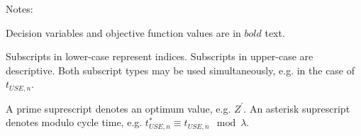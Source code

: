 Notes:

Decision variables and objective function values are in 
$\boldsymbol{\mathit{bold}}$ text.

Subscripts in lower-case represent indices.
Subscripts in upper-case are descriptive.
Both subscript types may be used simultaneously, e.g. in the case of
$t_{USE,n}$.

A prime suprescript denotes an optimum value, e.g. $Z^{\prime}$.
An asterisk suprescript denotes modulo cycle time, e.g.
$t_{\mathit{USE},n}^{*} \equiv t_{\mathit{USE},n} \mod \lambda$.
